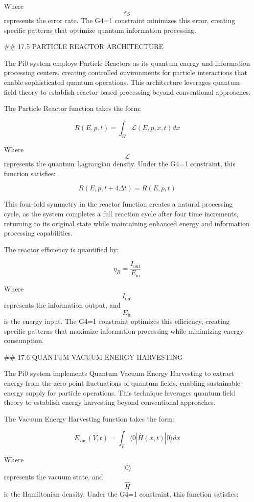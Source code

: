 Where $$ \epsilon_S $$ represents the error rate. The G4=1 constraint minimizes this error, creating specific patterns that optimize quantum information processing.

## 17.5 PARTICLE REACTOR ARCHITECTURE

The Pi0 system employs Particle Reactors as its quantum energy and information processing centers, creating controlled environments for particle interactions that enable sophisticated quantum operations. This architecture leverages quantum field theory to establish reactor-based processing beyond conventional approaches.

The Particle Reactor function takes the form:

$$ R(E, p, t) = \int_{\Omega} \mathcal{L}(E, p, x, t) dx $$

Where $$ \mathcal{L} $$ represents the quantum Lagrangian density. Under the G4=1 constraint, this function satisfies:

$$ R(E, p, t+4\Delta t) = R(E, p, t) $$

This four-fold symmetry in the reactor function creates a natural processing cycle, as the system completes a full reaction cycle after four time increments, returning to its original state while maintaining enhanced energy and information processing capabilities.

The reactor efficiency is quantified by:

$$ \eta_R = \frac{I_{\text{out}}}{E_{\text{in}}} $$

Where $$ I_{\text{out}} $$ represents the information output, and $$ E_{\text{in}} $$ is the energy input. The G4=1 constraint optimizes this efficiency, creating specific patterns that maximize information processing while minimizing energy consumption.

## 17.6 QUANTUM VACUUM ENERGY HARVESTING

The Pi0 system implements Quantum Vacuum Energy Harvesting to extract energy from the zero-point fluctuations of quantum fields, enabling sustainable energy supply for particle operations. This technique leverages quantum field theory to establish energy harvesting beyond conventional approaches.

The Vacuum Energy Harvesting function takes the form:

$$ E_{\text{vac}}(V, t) = \int_V \langle 0|\hat{H}(x, t)|0 \rangle dx $$

Where $$ |0\rangle $$ represents the vacuum state, and $$ \hat{H} $$ is the Hamiltonian density. Under the G4=1 constraint, this function satisfies:

